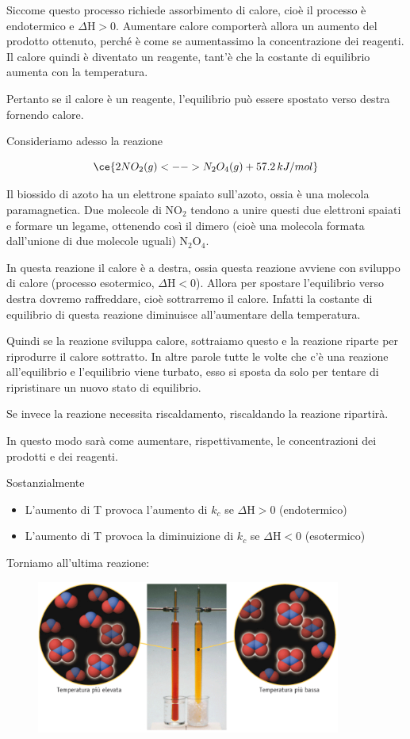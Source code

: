 Siccome questo processo richiede assorbimento di calore, cioè il processo è endotermico e $\Delta$H$>0$. Aumentare calore comporterà allora un aumento del prodotto ottenuto, perché è come se aumentassimo la concentrazione dei reagenti. Il calore quindi è diventato un reagente, tant'è che la costante di equilibrio aumenta con la temperatura.

Pertanto se il calore è un reagente, l'equilibrio può essere spostato verso destra fornendo calore.

Consideriamo adesso la reazione

$$\ce{2NO_2(g) <--> N_2O_4(g) + 57.2 \, kJ/mol}$$

Il biossido di azoto ha un elettrone spaiato sull'azoto, ossia è una molecola paramagnetica. Due molecole di NO$_2$ tendono a unire questi due elettroni spaiati e formare un legame, ottenendo così il dimero (cioè una molecola formata dall'unione di due molecole uguali) N$_2$O$_4$.

In questa reazione il calore è a destra, ossia questa reazione avviene con sviluppo di calore (processo esotermico, $\Delta$H$<0$). Allora per spostare l'equilibrio verso destra dovremo raffreddare, cioè sottrarremo il calore. Infatti la costante di equilibrio di questa reazione diminuisce all'aumentare della temperatura.

Quindi se la reazione sviluppa calore, sottraiamo questo e la reazione riparte per riprodurre il calore sottratto. In altre parole tutte le volte che c'è una reazione all'equilibrio e l'equilibrio viene turbato, esso si sposta da solo per tentare di ripristinare un nuovo stato di equilibrio.

Se invece la reazione necessita riscaldamento, riscaldando la reazione ripartirà.

In questo modo sarà come aumentare, rispettivamente, le concentrazioni dei prodotti e dei reagenti.

Sostanzialmente

\begin{itemize}
    \item L'aumento di T provoca l'aumento di $k_c$ se $\Delta$H$>0$ (endotermico)
    \item L'aumento di T provoca la diminuizione di $k_c$ se $\Delta$H$<0$ (esotermico)
\end{itemize}

Torniamo all'ultima reazione:

\begin{figure}[htp]
    \centering
    \includegraphics[width=10cm]{immagini/reazione_NO_2.png}
\end{figure}

